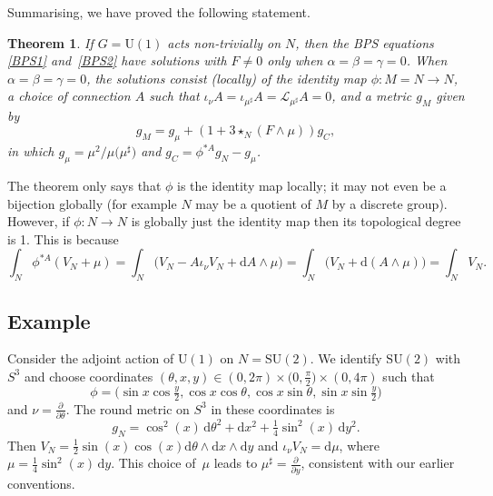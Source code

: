 \documentclass[10pt,a4paper]{amsart}
\newcommand{\SU}{{\mathrm{SU}}}
\newcommand{\U}{{\mathrm{U}}}
\newcommand{\1}{{\mathbb{1}}}
\def \d{\mathrm{d}}
\numberwithin{equation}{section}
\newtheorem{Theorem}{Theorem}[section]
\begin{document}
Summarising, we have proved the following statement.

\begin{Theorem}\label{thm:classification-S1}
If $G=\U(1)$ acts non-trivially on $N$, then the BPS equations \eqref{BPS1} and~\eqref{BPS2} have solutions with $F\neq0$ only when $\alpha=\beta=\gamma=0$. When $\alpha=\beta=\gamma=0$, the solutions consist (locally) of the identity map $\phi\colon M=N\to N$, a choice of connection $A$ such that $\iota_\nu A = \iota_{\mu^\sharp}A=\mathcal{L}_{\mu^\sharp}A=0$,
and a metric $g_M$ given by
\begin{equation*}
g_M = g_\mu + (1+3\star_N (F\wedge\mu))g_C,
\end{equation*}
in which $g_\mu=\mu^2/\mu\big(\mu^\sharp\big)$ and $g_C=\phi^{\ast A}g_N-g_\mu$.
\end{Theorem}
The theorem only says that $\phi$ is the identity map locally; it may not even be a bijection globally (for example $N$ may be a quotient of $M$ by a discrete group). However, if $\phi\colon N\to N$ is globally just the identity map then its topological degree is 1. This is because
\begin{equation*}
\int_N\phi^{\ast A}(V_N+\mu) = \int_N\big( V_N - A\iota_\nu V_N + \d A\wedge \mu\big) = \int_N\big(V_N + \d(A\wedge\mu)\big) = \int_N V_N.
\end{equation*}

\subsection{Example}

Consider the adjoint action of $\U(1)$ on $N=\SU(2)$. We identify $\SU(2)$ with $S^3$ and choose coordinates $(\theta,x,y)\in(0,2\pi)\times \big(0,\frac{\pi}{2}\big)\times (0,4\pi)$ such that
\begin{equation*}
\phi=\bigl( \sin x\cos\tfrac{y}{2},\cos x\cos \theta,\cos x\sin\theta , \sin x\sin\tfrac{y}{2}\bigr)
\end{equation*}
and $\nu=\frac{\partial}{\partial \theta}$. The round metric on $S^3$ in these coordinates is
\begin{equation*}
g_N = \cos^2(x)\,\d\theta^2 + \d x^2 + \tfrac{1}{4}\sin^2 (x)\,\d y^2.
\end{equation*}
Then $V_N=\frac12\sin (x)\cos (x) \d\theta\wedge \d x\wedge \d y$ and $\iota_\nu V_N =\d\mu$, where $\mu=\frac{1}{4}\sin^2 (x)\,\d y$. This choice of~$\mu$ leads to $\mu^\sharp=\frac{\partial}{\partial y}$, consistent with our earlier conventions.
\end{document}
